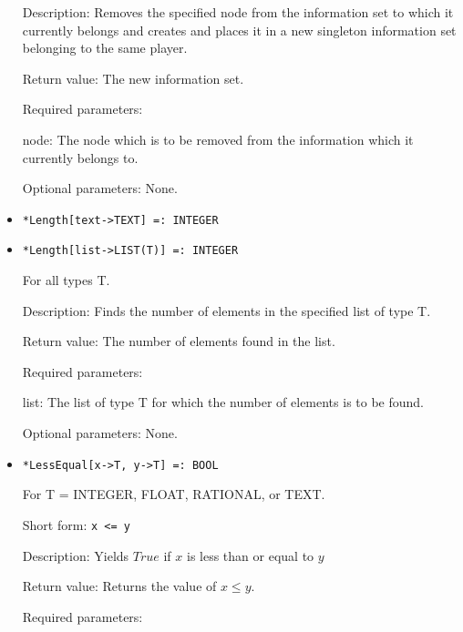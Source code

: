 \begin{itemize}
\bd
\item
[Description:] Removes the specified node from the information set to
which it currently belongs and creates and places it in a new
singleton information set belonging to the same player.
\item
[Return value:] The new information set.
\item
[Required parameters:]\hfil\null
	  
\bd
\item
[node:] The node which is to be removed from the information which it
currently belongs to.
\ed

\item
[Optional parameters:] None.
\ed

\item
\protect \large \begin{verbatim}
*Length[text->TEXT] =: INTEGER
\end{verbatim}\normalsize

\item
\protect \large \begin{verbatim}
*Length[list->LIST(T)] =: INTEGER
\end{verbatim}\normalsize
For all types T.

\bd
\item
[Description:] Finds the number of elements in the specified list of
type T.
\item
[Return value:] The number of elements found in the list.
\item
[Required parameters:]\hfil\null

\bd
\item
[list:] The list of type T for which the number of elements is to be
found.
\ed

\item
[Optional parameters:] None.
\ed

\item
\protect \large \begin{verbatim}
*LessEqual[x->T, y->T] =: BOOL
\end{verbatim}\normalsize

For T = INTEGER, FLOAT, RATIONAL, or TEXT.

\bd
\item
[Short form:] \verb+x <= y+
\item
[Description:] Yields $True$ if $x$ is less than or equal to $y$
\item
[Return value:] Returns the value of $x \leq y$.
\item
[Required parameters:]\hfil\null


\end{itemize}
